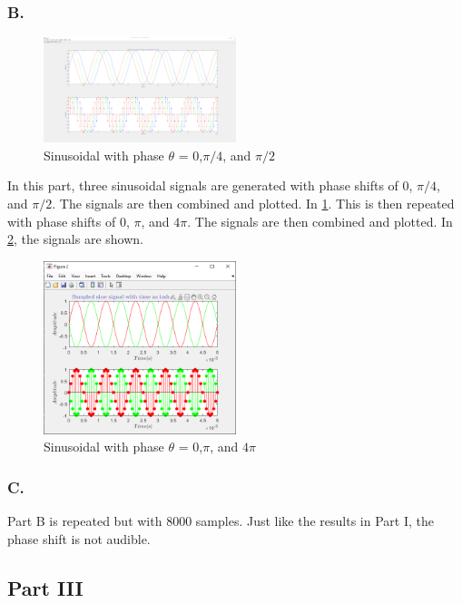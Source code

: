 \documentclass[12pt]{article}
\begin{document}
\subsubsection*{B.}
\begin{figure}[H]
	\centering
	\includegraphics[width=0.5\textwidth]{fig 2b1.png}
	\caption{Sinusoidal with phase $\theta$ = 0,$\pi/4$, and $\pi/2$}
	\label{fig:fig5}
\end{figure}
In this part, three sinusoidal signals are generated with phase shifts of 0, $\pi/4$,
and $\pi/2$. The signals are then combined and plotted. In \ref{fig:fig5}. This is then
repeated with phase shifts of 0, $\pi$, and $4\pi$. The signals are then combined and 
plotted. In \ref{fig:fig6}, the signals are shown. 

\begin{figure}[H]
	\centering
	\includegraphics[width=0.5\textwidth]{fig 2b2.png}
	\caption{Sinusoidal with phase $\theta$ = 0,$\pi$, and $4\pi$}
	\label{fig:fig6}
\end{figure}

\subsubsection*{C.}
Part B is repeated but with 8000 samples. Just like the results in Part I,
the phase shift is not audible.

\subsection*{Part III}
\end{document}
